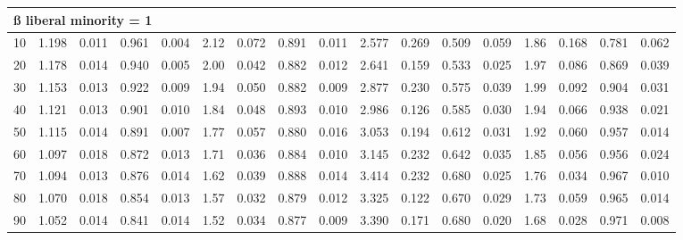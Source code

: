 \documentclass[
]{article}
\begin{document}
\begin{table}[H]
\begin{table}
{\begin{tabular}{r|r|r|r|r|r|r|r|r|r|r|r|r|r|r|r|r}
\hline
\multicolumn{17}{l}{\textbf{ß liberal minority = 1}}\\
\hline
\hspace{1em}10 & 1.198 & 0.011 & 0.961 & 0.004 & 2.12 & 0.072 & 0.891 & 0.011 & 2.577 & 0.269 & 0.509 & 0.059 & 1.86 & 0.168 & 0.781 & 0.062\\
\hline
\hspace{1em}20 & 1.178 & 0.014 & 0.940 & 0.005 & 2.00 & 0.042 & 0.882 & 0.012 & 2.641 & 0.159 & 0.533 & 0.025 & 1.97 & 0.086 & 0.869 & 0.039\\
\hline
\hspace{1em}30 & 1.153 & 0.013 & 0.922 & 0.009 & 1.94 & 0.050 & 0.882 & 0.009 & 2.877 & 0.230 & 0.575 & 0.039 & 1.99 & 0.092 & 0.904 & 0.031\\
\hline
\hspace{1em}40 & 1.121 & 0.013 & 0.901 & 0.010 & 1.84 & 0.048 & 0.893 & 0.010 & 2.986 & 0.126 & 0.585 & 0.030 & 1.94 & 0.066 & 0.938 & 0.021\\
\hline
\hspace{1em}50 & 1.115 & 0.014 & 0.891 & 0.007 & 1.77 & 0.057 & 0.880 & 0.016 & 3.053 & 0.194 & 0.612 & 0.031 & 1.92 & 0.060 & 0.957 & 0.014\\
\hline
\hspace{1em}60 & 1.097 & 0.018 & 0.872 & 0.013 & 1.71 & 0.036 & 0.884 & 0.010 & 3.145 & 0.232 & 0.642 & 0.035 & 1.85 & 0.056 & 0.956 & 0.024\\
\hline
\hspace{1em}70 & 1.094 & 0.013 & 0.876 & 0.014 & 1.62 & 0.039 & 0.888 & 0.014 & 3.414 & 0.232 & 0.680 & 0.025 & 1.76 & 0.034 & 0.967 & 0.010\\
\hline
\hspace{1em}80 & 1.070 & 0.018 & 0.854 & 0.013 & 1.57 & 0.032 & 0.879 & 0.012 & 3.325 & 0.122 & 0.670 & 0.029 & 1.73 & 0.059 & 0.965 & 0.014\\
\hline
\hspace{1em}90 & 1.052 & 0.014 & 0.841 & 0.014 & 1.52 & 0.034 & 0.877 & 0.009 & 3.390 & 0.171 & 0.680 & 0.020 & 1.68 & 0.028 & 0.971 & 0.008\\
\hline
\end{tabular}}
\end{table}
\end{table}
\end{document}
